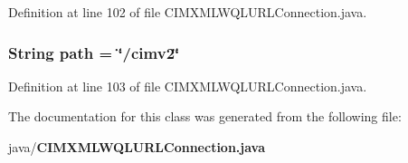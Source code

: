 Definition at line 102 of file C\+I\+M\+X\+M\+L\+W\+Q\+L\+U\+R\+L\+Connection.\+java.

\subsubsection[{path}]{\setlength{\rightskip}{0pt plus 5cm}String path = \char`\"{}/cimv2\char`\"{}\hspace{0.3cm}{\ttfamily [protected]}}\label{classorg_1_1smallfoot_1_1parser_1_1cimcql_1_1CIMXMLWQLURLConnection_adb85e16ac8c9f62df2d33b1262649843}


Definition at line 103 of file C\+I\+M\+X\+M\+L\+W\+Q\+L\+U\+R\+L\+Connection.\+java.



The documentation for this class was generated from the following file\+:\begin{DoxyCompactItemize}
\item 
java/{\bf C\+I\+M\+X\+M\+L\+W\+Q\+L\+U\+R\+L\+Connection.\+java}\end{DoxyCompactItemize}
